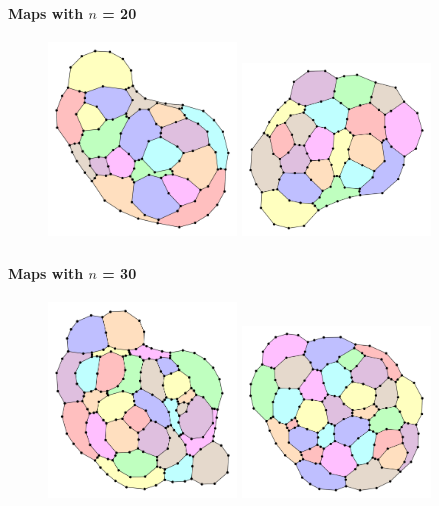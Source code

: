 \documentclass[t,18pt]{beamer}
\begin{document}
\begin{frame}[c]
  \frametitle{}
  \framesubtitle{Maps with $n$ = 20}
  \begin{figure}
    \includegraphics[width=5cm]{../Thesis/Resources/Evaluation-Example-n20-450053F2-5F0A-4CFE-8A08-92CC201A07B9-0.pdf}
    \quad
    \includegraphics[width=5cm]{../Thesis/Resources/Evaluation-Example-n20-AE097F3A-14FD-4735-A19B-8FD343CA3346-0.pdf}
  \end{figure}
\end{frame}

\begin{frame}[c]
  \frametitle{}
  \framesubtitle{Maps with $n$ = 30}
  \begin{figure}
    \includegraphics[width=5cm]{../Thesis/Resources/Evaluation-Example-n30-9BA67779-50C2-483B-8E81-916125D5D3F7-0.pdf}
    \quad
    \includegraphics[width=5cm]{../Thesis/Resources/Evaluation-Example-n30-45D8EAD2-210C-4F04-8C7F-EA3E65484875-0.pdf}
  \end{figure}
\end{frame}
\end{document}
